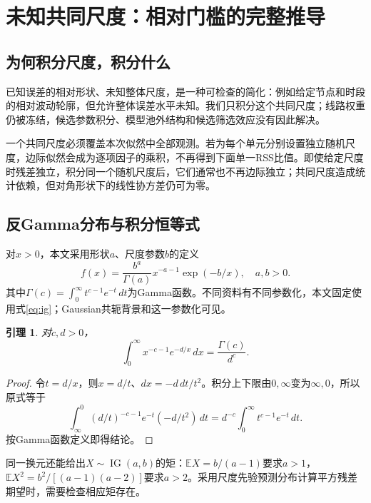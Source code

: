 \documentclass[UTF8,11pt,a4paper,fontset=fandol]{ctexart}
\newcommand{\E}{\mathbb E}
\newcommand{\IG}{\operatorname{IG}}
\newtheorem{lemma}[proposition]{引理}
\numberwithin{equation}{section}
\begin{document}
\section{未知共同尺度：相对门槛的完整推导}
\label{sec:scale}
\subsection{为何积分尺度，积分什么}
已知误差的相对形状、未知整体尺度，是一种可检查的简化：例如给定节点和时段的相对波动轮廓，但允许整体误差水平未知。我们只积分这个共同尺度；线路权重仍被冻结，候选参数积分、模型池外结构和候选筛选效应没有因此解决。

一个共同尺度必须覆盖本次似然中全部观测。若为每个单元分别设置独立随机尺度，边际似然会成为逐项因子的乘积，不再得到下面单一RSS比值。即使给定尺度时残差独立，积分同一个随机尺度后，它们通常也不再边际独立；共同尺度造成统计依赖，但对角形状下的线性协方差仍可为零。

\subsection{反Gamma分布与积分恒等式}
对$x>0$，本文采用形状$a$、尺度参数$b$的定义
\begin{equation}
f(x)=\frac{b^a}{\Gamma(a)}x^{-a-1}\exp(-b/x),\quad a,b>0.
\label{eq:ig}
\end{equation}
其中$\Gamma(c)=\int_0^\infty t^{c-1}e^{-t}\,dt$为Gamma函数。不同资料有不同参数化，本文固定使用式\eqref{eq:ig}；Gaussian共轭背景和这一参数化可见\citet[第10.2节]{murphy2007}。

\begin{lemma}\label{lem:integral}
对$c,d>0$，
\begin{equation}
\int_0^\infty x^{-c-1}e^{-d/x}\,dx=\frac{\Gamma(c)}{d^c}.
\label{eq:integral}
\end{equation}
\end{lemma}
\begin{proof}
令$t=d/x$，则$x=d/t$、$dx=-d\,dt/t^2$。积分上下限由$0,\infty$变为$\infty,0$，所以原式等于
\[
\int_\infty^0(d/t)^{-c-1}e^{-t}(-d/t^2)\,dt
=d^{-c}\int_0^\infty t^{c-1}e^{-t}\,dt.
\]
按Gamma函数定义即得结论。
\end{proof}

同一换元还能给出$X\sim\IG(a,b)$的矩：$\E X=b/(a-1)$要求$a>1$，$\E X^2=b^2/[(a-1)(a-2)]$要求$a>2$。采用尺度先验预测分布计算平方残差期望时，需要检查相应矩存在。
\end{document}
